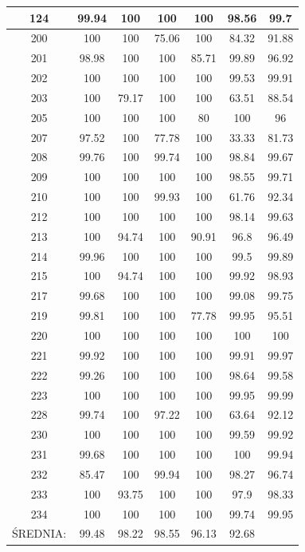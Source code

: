 \documentclass[10pt,a4paper]{article}
\begin{document}
\begin{table}
{\begin{tabular}{ | c | c | c | c | c | c | c |}
	124 & 99.94 & 100 & 100 & 100 & 98.56 & 99.7 \\ \hline
	200 & 100 & 100 & 75.06 & 100 & 84.32 & 91.88 \\ \hline
	201 & 98.98 & 100 & 100 & 85.71 & 99.89 & 96.92 \\ \hline
	202 & 100 & 100 & 100 & 100 & 99.53 & 99.91 \\ \hline
	203 & 100 & 79.17 & 100 & 100 & 63.51 & 88.54 \\ \hline
	205 & 100 & 100 & 100 & 80 & 100 & 96 \\ \hline
	207 & 97.52 & 100 & 77.78 & 100 & 33.33 & 81.73 \\ \hline
	208 & 99.76 & 100 & 99.74 & 100 & 98.84 & 99.67 \\ \hline
	209 & 100 & 100 & 100 & 100 & 98.55 & 99.71 \\ \hline
	210 & 100 & 100 & 99.93 & 100 & 61.76 & 92.34 \\ \hline
	212 & 100 & 100 & 100 & 100 & 98.14 & 99.63 \\ \hline
	213 & 100 & 94.74 & 100 & 90.91 & 96.8 & 96.49 \\ \hline
	214 & 99.96 & 100 & 100 & 100 & 99.5 & 99.89 \\ \hline
	215 & 100 & 94.74 & 100 & 100 & 99.92 & 98.93 \\ \hline
	217 & 99.68 & 100 & 100 & 100 & 99.08 & 99.75 \\ \hline
	219 & 99.81 & 100 & 100 & 77.78 & 99.95 & 95.51 \\ \hline
	220 & 100 & 100 & 100 & 100 & 100 & 100 \\ \hline
	221 & 99.92 & 100 & 100 & 100 & 99.91 & 99.97 \\ \hline
	222 & 99.26 & 100 & 100 & 100 & 98.64 & 99.58 \\ \hline
	223 & 100 & 100 & 100 & 100 & 99.95 & 99.99 \\ \hline
	228 & 99.74 & 100 & 97.22 & 100 & 63.64 & 92.12 \\ \hline
	230 & 100 & 100 & 100 & 100 & 99.59 & 99.92 \\ \hline
	231 & 99.68 & 100 & 100 & 100 & 100 & 99.94 \\ \hline
	232 & 85.47 & 100 & 99.94 & 100 & 98.27 & 96.74 \\ \hline
	233 & 100 & 93.75 & 100 & 100 & 97.9 & 98.33 \\ \hline
	234 & 100 & 100 & 100 & 100 & 99.74 & 99.95 \\ \hline
	ŚREDNIA: & 99.48 & 98.22 & 98.55 & 96.13 & 92.68 &  \\ \hline

\end{tabular}
}

\end{table}
\end{document}

